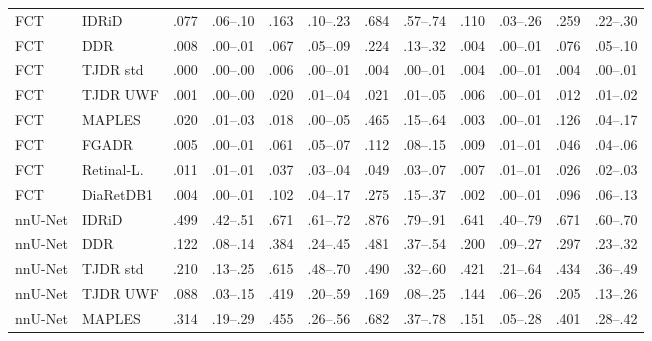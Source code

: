 \begin{landscape}
{\begin{longtable}{l l c c c c c c c c c c}
FCT & IDRiD & .077 & \scriptsize .06--.10 & .163 & \scriptsize .10--.23 & .684 & \scriptsize .57--.74 & .110 & \scriptsize .03--.26 & .259 & \scriptsize .22--.30 \\
FCT & DDR & .008 & \scriptsize .00--.01 & .067 & \scriptsize .05--.09 & .224 & \scriptsize .13--.32 & .004 & \scriptsize .00--.01 & .076 & \scriptsize .05--.10 \\
FCT & TJDR std & .000 & \scriptsize .00--.00 & .006 & \scriptsize .00--.01 & .004 & \scriptsize .00--.01 & .004 & \scriptsize .00--.01 & .004 & \scriptsize .00--.01 \\
FCT & TJDR UWF & .001 & \scriptsize .00--.00 & .020 & \scriptsize .01--.04 & .021 & \scriptsize .01--.05 & .006 & \scriptsize .00--.01 & .012 & \scriptsize .01--.02 \\
FCT & MAPLES & .020 & \scriptsize .01--.03 & .018 & \scriptsize .00--.05 & .465 & \scriptsize .15--.64 & .003 & \scriptsize .00--.01 & .126 & \scriptsize .04--.17 \\
FCT & FGADR & .005 & \scriptsize .00--.01 & .061 & \scriptsize .05--.07 & .112 & \scriptsize .08--.15 & .009 & \scriptsize .01--.01 & .046 & \scriptsize .04--.06 \\
FCT & Retinal-L. & .011 & \scriptsize .01--.01 & .037 & \scriptsize .03--.04 & .049 & \scriptsize .03--.07 & .007 & \scriptsize .01--.01 & .026 & \scriptsize .02--.03 \\
FCT & DiaRetDB1 & .004 & \scriptsize .00--.01 & .102 & \scriptsize .04--.17 & .275 & \scriptsize .15--.37 & .002 & \scriptsize .00--.01 & .096 & \scriptsize .06--.13 \\
nnU-Net & IDRiD & .499 & \scriptsize .42--.51 & .671 & \scriptsize .61--.72 & .876 & \scriptsize .79--.91 & .641 & \scriptsize .40--.79 & .671 & \scriptsize .60--.70 \\
nnU-Net & DDR & .122 & \scriptsize .08--.14 & .384 & \scriptsize .24--.45 & .481 & \scriptsize .37--.54 & .200 & \scriptsize .09--.27 & .297 & \scriptsize .23--.32 \\
nnU-Net & TJDR std & .210 & \scriptsize .13--.25 & .615 & \scriptsize .48--.70 & .490 & \scriptsize .32--.60 & .421 & \scriptsize .21--.64 & .434 & \scriptsize .36--.49 \\
nnU-Net & TJDR UWF & .088 & \scriptsize .03--.15 & .419 & \scriptsize .20--.59 & .169 & \scriptsize .08--.25 & .144 & \scriptsize .06--.26 & .205 & \scriptsize .13--.26 \\
nnU-Net & MAPLES & .314 & \scriptsize .19--.29 & .455 & \scriptsize .26--.56 & .682 & \scriptsize .37--.78 & .151 & \scriptsize .05--.28 & .401 & \scriptsize .28--.42 \\

\end{longtable}}
\end{landscape}
